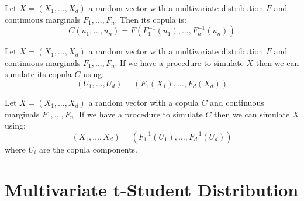 \documentclass[11pt,fleqn]{book} %
\begin{document}
\begin{corollary}
	\label{cor:cop1}
	Let $X=(X_1, \dots, X_d)$ a random vector with a multivariate 
	distribution $F$ and continuous marginals $F_1, \dots, F_n$. 
	Then its copula is:
	\begin{displaymath}
		C(u_1,\dots,u_n) = F(F_1^{-1}(u_1), \dots, F_n^{-1}(u_n))
	\end{displaymath}
\end{corollary}

\begin{corollary}
	\label{cor:cop2}
	Let $X=(X_1, \dots, X_d)$ a random vector with a multivariate 
	distribution $F$ and continuous marginals $F_1, \dots, F_n$.
	If we have a procedure to simulate $X$ then we can simulate 
	its copula $C$ using:
	\begin{displaymath}
		(U_1, \dots, U_d) = (F_1(X_1), \dots, F_d(X_d))
	\end{displaymath}
\end{corollary}

\begin{corollary}
	\label{cor:cop3}
	Let $X=(X_1, \dots, X_d)$ a random vector with a copula $C$
	and continuous marginals $F_1, \dots, F_n$. If we have a
	procedure to simulate $C$ then we can simulate $X$ using:
	\begin{displaymath}
		(X_1, \dots, X_d) = (F_1^{-1}(U_1), \dots, F_d^{-1}(U_d))
	\end{displaymath}
	where $U_i$ are the copula components.
\end{corollary}


\section{Multivariate t-Student Distribution}
\end{document}

